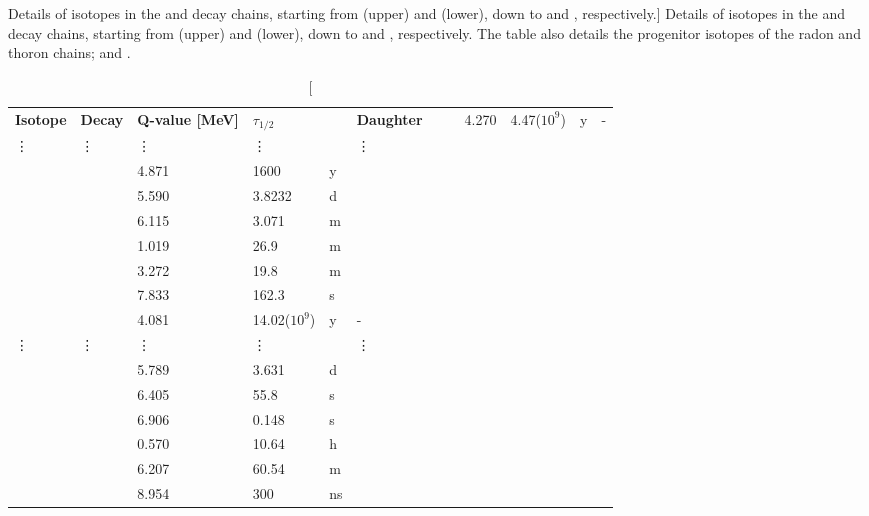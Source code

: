 \begin{table}[h]
\centering
\caption
[Details of isotopes in the \RnTTT{} and \RnTTZ{} decay chains, starting from \RaTTS{} (upper) and \RaTTF{} (lower), down to \PoTOF{} and \PoTOT{}, respectively.]
{Details of isotopes in the \RnTTT{} and \RnTTZ{} decay chains, starting from \RaTTS{} (upper) and \RaTTF{} (lower), down to \PoTOF{} and \PoTOT{}, respectively. The table also details the progenitor isotopes of the radon and thoron chains; \UTTE{} and \ThTTT{}.}
\label{tab:radon_decay_chains}
\vspace{1mm}
\renewcommand{\arraystretch}{1.2}
    \begin{tabularx}{1.0\textwidth}{@{\extracolsep{\fill}}llllll}
    \toprule
    
    \textbf{Isotope} & %
    \textbf{Decay} & %
    \textbf{Q-value [MeV]} & %
    \textbf{$\tau_{1/2}$} & %
    & %
    \textbf{Daughter} & %
    
    \hline
    \hline
    
    \UTTE{}	    & \alpha{}      & 4.270     & 4.47($10^{9}$)  & y     & - \\ 
    \vdots      & \vdots        & \vdots    & \vdots          &       & \vdots \\ 
    \RaTTS{}	& \alpha{}      & 4.871     & 1600            & y     & \RnTTT{} \\ 
    \RnTTT{}	& \alpha{}      & 5.590     & 3.8232          & d     & \PoTOE{} \\ 
    \PoTOE{}	& \alpha{}      & 6.115     & 3.071           & m     & \PbTOF{} \\
    \PbTOF{}	& \beta{}       & 1.019     & 26.9            & m     & \BiTOF{} \\
    \BiTOF{}	& \beta{}       & 3.272     & 19.8            & m     & \PoTOF{} \\
    \PoTOF{}	& \alpha{}      & 7.833     & 162.3           & \micro{}s  & \PbTOZ{} \\
    
    \hline
    \hline
    
    \ThTTT{}	& \alpha{}      & 4.081     & 14.02($10^{9}$)   & y     & - \\ 
    \vdots      & \vdots        & \vdots    & \vdots            &       & \vdots \\ 
    \RaTTF{}	& \alpha{}      & 5.789     & 3.631             & d     & \RnTTZ{} \\ 
    \RnTTZ{}	& \alpha{}      & 6.405     & 55.8              & s     & \PoTOS{} \\ 
    \PoTOS{}	& \alpha{}      & 6.906     & 0.148             & s     & \PbTOT{} \\
    \PbTOT{}	& \beta{}       & 0.570     & 10.64             & h     & \BiTOT{} \\
    \BiTOT{}	& \beta{}       & 6.207     & 60.54             & m     & \PoTOT{} \\
    \PoTOT{}	& \alpha{}      & 8.954     & 300               & ns    & \PbTZE{} \\
    
    \bottomrule
    \end{tabularx}
\end{table}

